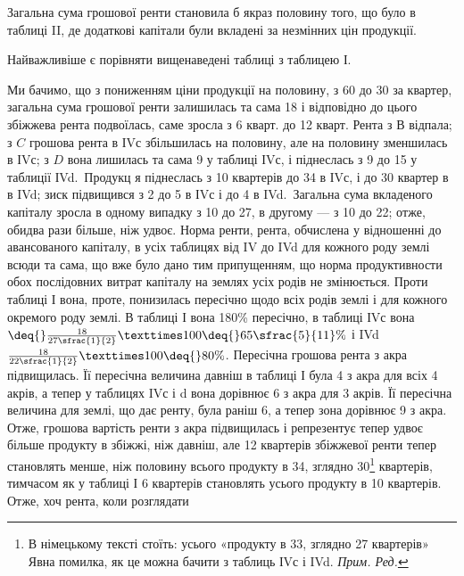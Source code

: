
Загальна сума грошової ренти становила б якраз половину того, що було
в таблиці II, де додаткові капітали були вкладені за незмінних цін продукції.

Найважливіше є порівняти вищенаведені таблиці з таблицею І.

Ми бачимо, що з пониженням ціни продукції на половину, з 60 до
30 за квартер, загальна сума грошової ренти залишилась та сама \deq{} 18 і відповідно до цього збіжжева рента подвоїлась, саме зросла з 6 кварт. до
12 кварт. Рента з $В$ відпала; з $C$ грошова рента в ІVс збільшилась на половину,
але на половину зменшилась в ІVс; з $D$ вона лишилась та сама \deq{} 9 у таблиці ІVс, і піднеслась з 9 до 15 у таблиції ІVd.~Продукц я піднеслась з 10 квартерів до 34 в ІVс, і до 30 квартер в в IVd;
зиск підвищився з 2 до 5 в ІVс і до 4 в IVd.~Загальна сума
вкладеного капіталу зросла в одному випадку з 10 до 27,
в другому — з 10 до 22; отже, обидва рази більше, ніж удвоє. Норма
ренти, рента, обчислена у відношенні до авансованого капіталу, в усіх таблицях
від IV до IVd для кожного роду землі всюди та сама, що вже було дано тим припущенням,
що норма продуктивности обох послідовних витрат капіталу на землях
усіх родів не змінюється. Проти таблиці І вона, проте, понизилась пересічно
щодо всіх родів землі і для кожного окремого роду землі. В таблиці І вона \deq{}
180\% пересічно, в таблиці ІVс вона$ \deq{} \frac{18}{27\sfrac{1}{2}} × 100 \deq{} 65\sfrac{5}{11}\%$ і
IVd \deq{} $\frac{18}{22\sfrac{1}{2}} × 100 \deq{} 80\%$. Пересічна грошова рента з акра підвищилась. Її пересічна
величина давніш в таблиці І була 4 з акра для всіх 4 акрів,
а тепер у таблицях IVс і d вона дорівнює 6 з акра для 3 акрів.
Її пересічна величина для землі, що дає ренту, була раніш 6, а тепер
зона дорівнює 9 з акра. Отже, грошова вартість ренти з акра підвищилась
і репрезентує тепер удвоє більше продукту в збіжжі, ніж давніш, але
12 квартерів збіжжевої ренти тепер становлять менше, ніж половину всього продукту
в 34, зглядно 30\footnote*{В німецькому тексті стоїть: усього «продукту в 33, зглядно 27 квартерів» Явна помилка,
як це можна бачити з таблиць ІVс і IVd. \emph{Прим. Ред.}} квартерів, тимчасом як у таблиці І 6 квартерів становлять
  усього продукту в 10 квартерів. Отже, хоч рента, коли розглядати
